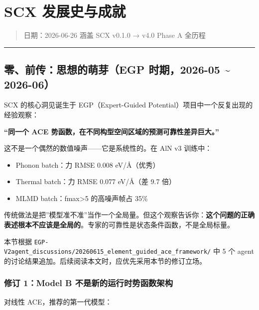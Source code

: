 \documentclass[
  12pt,
]{ctexart}
\author{SCX}
\date{2026}
\providecommand{\tightlist}{%
  \setlength{\itemsep}{0pt}\setlength{\parskip}{0pt}}
\begin{document}
\section{SCX
发展史与成就}\label{scx-ux53d1ux5c55ux53f2ux4e0eux6210ux5c31}

\begin{quote}
日期：2026-06-26 \textbar{} 涵盖 SCX v0.1.0 → v4.0 Phase A 全历程
\end{quote}

\begin{center}\rule{0.5\linewidth}{0.5pt}\end{center}

\subsection{零、前传：思想的萌芽（EGP 时期，2026-05 \textasciitilde{}
2026-06）}\label{ux96f6ux524dux4f20ux601dux60f3ux7684ux840cux82bdegp-ux65f6ux671f2026-05-2026-06}

SCX 的核心洞见诞生于 EGP（Expert-Guided
Potential）项目中一个反复出现的经验观察：

\textbf{``同一个 ACE 势函数，在不同构型空间区域的预测可靠性差异巨大。''}

这不是一个偶然的数值噪声------它是系统性的。在 AlN v3 训练中：

\begin{itemize}
\tightlist
\item
  Phonon batch：力 RMSE 0.008 eV/Å（优秀）
\item
  Thermal batch：力 RMSE 0.077 eV/Å（差 9.7 倍）
\item
  MLMD batch：fmax\textgreater5 的高噪声帧占 35\%
\end{itemize}

传统做法是把''模型准不准''当作一个全局量。但这个观察告诉你：\textbf{这个问题的正确表述根本不应该是全局的}。专家的可靠性是状态条件函数，不是全局标量。

本节根据
\texttt{EGP-V2agent\_discussions/20260615\_element\_guided\_ace\_framework/}
中 5 个 agent 的讨论结果追加。后续阅读本文时，应优先采用本节的修订立场。

\subsubsection{修订 1：Model B
不是新的运行时势函数架构}\label{ux4feeux8ba2-1model-b-ux4e0dux662fux65b0ux7684ux8fd0ux884cux65f6ux52bfux51fdux6570ux67b6ux6784}

对线性 ACE，推荐的第一代模型：
\end{document}
